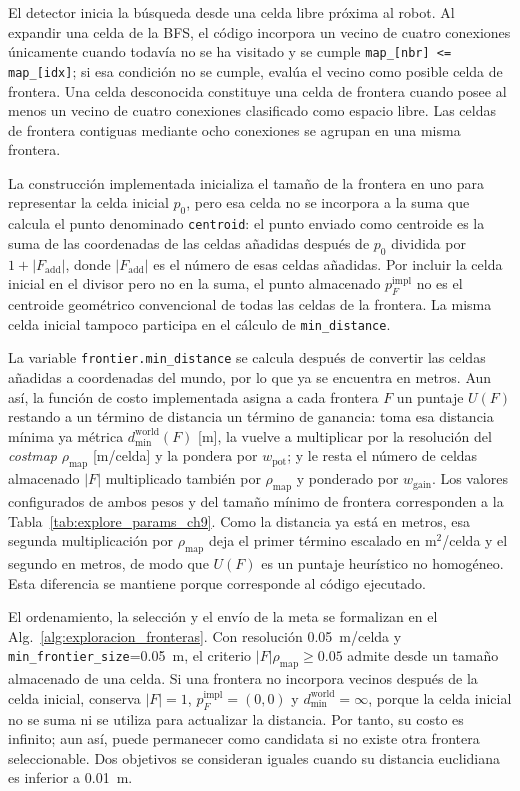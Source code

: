 \begin{appendices}
El detector inicia la búsqueda desde una celda libre próxima al robot. Al expandir una celda de la BFS, el código incorpora un vecino de cuatro conexiones únicamente cuando todavía no se ha visitado y se cumple \texttt{map\_[nbr] <= map\_[idx]}; si esa condición no se cumple, evalúa el vecino como posible celda de frontera. Una celda desconocida constituye una celda de frontera cuando posee al menos un vecino de cuatro conexiones clasificado como espacio libre. Las celdas de frontera contiguas mediante ocho conexiones se agrupan en una misma frontera.

La construcción implementada inicializa el tamaño de la frontera en uno para representar la celda inicial $p_0$, pero esa celda no se incorpora a la suma que calcula el punto denominado \texttt{centroid}: el punto enviado como centroide es la suma de las coordenadas de las celdas añadidas después de $p_0$ dividida por $1+|F_{\mathrm{add}}|$, donde $|F_{\mathrm{add}}|$ es el número de esas celdas añadidas. Por incluir la celda inicial en el divisor pero no en la suma, el punto almacenado $p_F^{\mathrm{impl}}$ no es el centroide geométrico convencional de todas las celdas de la frontera. La misma celda inicial tampoco participa en el cálculo de \texttt{min\_distance}.

La variable \texttt{frontier.min\_distance} se calcula después de convertir las celdas añadidas a coordenadas del mundo, por lo que ya se encuentra en metros. Aun así, la función de costo implementada asigna a cada frontera $F$ un puntaje $U(F)$ restando a un término de distancia un término de ganancia: toma esa distancia mínima ya métrica $d_{\mathrm{min}}^{\mathrm{world}}(F)$ [m], la vuelve a multiplicar por la resolución del \textit{costmap} $\rho_{\mathrm{map}}$ [m/celda] y la pondera por $w_{\mathrm{pot}}$; y le resta el número de celdas almacenado $|F|$ multiplicado también por $\rho_{\mathrm{map}}$ y ponderado por $w_{\mathrm{gain}}$. Los valores configurados de ambos pesos y del tamaño mínimo de frontera corresponden a la Tabla~\ref{tab:explore_params_ch9}. Como la distancia ya está en metros, esa segunda multiplicación por $\rho_{\mathrm{map}}$ deja el primer término escalado en m$^2$/celda y el segundo en metros, de modo que $U(F)$ es un puntaje heurístico no homogéneo. Esta diferencia se mantiene porque corresponde al código ejecutado.

El ordenamiento, la selección y el envío de la meta se formalizan en el Alg.~\ref{alg:exploracion_fronteras}. Con resolución 0.05~m/celda y \texttt{min\_frontier\_size}=0.05~m, el criterio $|F|\rho_{\mathrm{map}}\geq0.05$ admite desde un tamaño almacenado de una celda. Si una frontera no incorpora vecinos después de la celda inicial, conserva $|F|=1$, $p_F^{\mathrm{impl}}=(0,0)$ y $d_{\mathrm{min}}^{\mathrm{world}}=\infty$, porque la celda inicial no se suma ni se utiliza para actualizar la distancia. Por tanto, su costo es infinito; aun así, puede permanecer como candidata si no existe otra frontera seleccionable. Dos objetivos se consideran iguales cuando su distancia euclidiana es inferior a 0.01~m.


\end{appendices}
